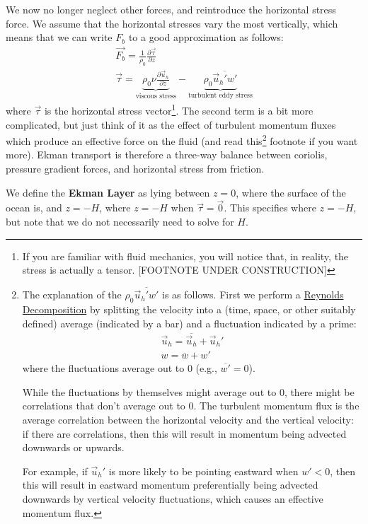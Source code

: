 We now no longer neglect other forces, and reintroduce the horizontal stress force. We assume that the horizontal stresses vary the most vertically, which means that we can write $F_b$ to a good approximation as follows:
\begin{gather*}
    \vec{F_b} = \frac{1}{\rho_0}\frac{\partial \vec{\tau}}{\partial z}\\
    \vec{\tau}=\underbrace{\rho_0\nu\frac{\partial \vec{u}_h}{\partial z}}_{\text{viscous stress}}-
    \underbrace{\rho_0 \overline{\vec{u}_h'w'}}_{\text{turbulent eddy stress}}
\end{gather*}
where $\vec{\tau}$ is the horizontal stress vector\footnote{If you are familiar with fluid mechanics, you will notice that, in reality, the stress is actually a tensor. [FOOTNOTE UNDER CONSTRUCTION]}. The second term is a bit more complicated, but just think of it as the effect of turbulent momentum fluxes which produce an effective force on the fluid (and read this\footnote{
    The explanation of the $\rho_0 \overline{\vec{u}_h'w'}$ is as follows. First we perform a \href{https://en.wikipedia.org/wiki/Reynolds_decomposition}{Reynolds Decomposition} by splitting the velocity into a (time, space, or other suitably defined) average (indicated by a bar) and a fluctuation indicated by a prime:
    \begin{align*}
        \vec{u}_h = \overline{\vec{u}_h}+\vec{u}_h'
        \\
        w = \overline{w}+w'
    \end{align*}
    where the fluctuations average out to $0$ (e.g., $\overline{w'}=0$).

    While the fluctuations by themselves might average out to $0$, there might be correlations that don't average out to $0$. The turbulent momentum flux is the average correlation between the horizontal velocity and the vertical velocity: if there are correlations, then this will result in momentum being advected downwards or upwards. 
    
    For example, if $\vec{u}_h'$ is more likely to be pointing eastward when $w'<0$, then this will result in eastward momentum preferentially being advected downwards by vertical velocity fluctuations, which causes an effective momentum flux.
} footnote if you want more). Ekman transport is therefore a three-way balance between coriolis, pressure gradient forces, and horizontal stress from friction.

We define the \textbf{Ekman Layer} as lying between $z=0$, where the surface of the ocean is, and $z=-H$, where $z=-H$ when $\vec{\tau}=\vec{0}$. This specifies where $z=-H$, but note that we do not necessarily need to solve for $H$.

